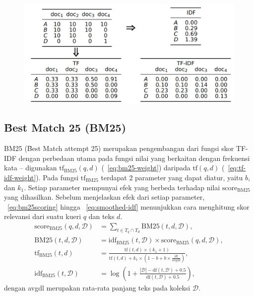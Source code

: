     
    \begin{figure}[!ht]
        \centering
        \includegraphics[width=1\textwidth]{assets/pics/tf-idf-matriks.png}
        \label{fig:tf-idf-matriks}
    \end{figure}
    \subsection{\f{Best Match 25} (BM25)}
    \label{sec:bm25}
    
    BM25 (\f{Best Match attempt} 25)  merupakan pengembangan dari fungsi skor TF-IDF dengan perbedaan utama pada fungsi nilai yang berkaitan dengan frekuensi kata -- digunakan $\text{tf}_{\text{BM25}}(q,d)$ (\equ~\ref{eq:bm25-weight}) daripada $\text{tf}(q,d)$ (\equ~\ref{eq:tf-idf-weight}). Pada fungsi $\text{tf}_{\text{BM25}}$ terdapat 2 parameter yang dapat diatur, yaitu $b$, dan $k_1$. Setiap parameter mempunyai efek yang berbeda terhadap nilai $\text{score}_{\text{BM25}}$ yang dihasilkan. Sebelum menjelaskan efek dari setiap parameter, \equ~\ref{eq:bm25scoring} hingga \equ~\ref{eq:smoothed-idf} menunjukkan cara menghitung skor relevansi dari suatu kueri $q$ dan teks $d$. 
    \begin{align}
        \label{eq:bm25scoring}
        \text{score}_{\text{BM25}}(q,d,\mathcal{D}) &= \sum_{t \in T_q \cap T_d} \text{BM25}(t, d, \mathcal{D}),\\
        \label{eq:bm25-weight}
        \text{BM25}(t, d, \mathcal{D}) &= \text{idf}_{\text{BM25}}(t, \mathcal{D}) \times \text{score}_{\text{BM25}}(q,d,\mathcal{D}), \\
        \text{tf}_{\text{BM25}}(t,d) &= \frac{\text{tf}(t, d) \times (k_1 + 1)}{\text{tf}(t, d) + k_1 \times (1 - b + b \times \frac{|d|}{\text{avgdl}})}, \\
        \label{eq:smoothed-idf}
        \text{idf}_{\text{BM25}}(t, \mathcal{D}) &= \log\left(1+\frac{|\mathcal{D}| - \text{df}(t, \mathcal{D}) + 0.5}{\text{df}(t, \mathcal{D}) + 0.5}\right),
    \end{align}
dengan avgdl merupakan rata-rata panjang teks pada koleksi $\mathcal{D}$.
        
